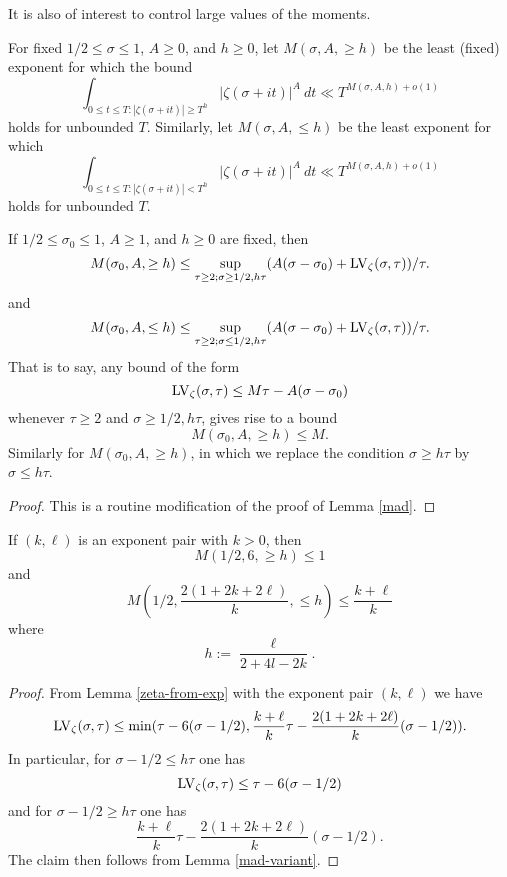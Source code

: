 It is also of interest to control large values of the moments.

\begin{definition}\label{mixed-moment-def}
    For fixed $1/2 \leq \sigma \leq 1$, $A \geq 0$, and $h \geq 0$, let $M(\sigma,A, \geq h)$ be the least (fixed) exponent for which the bound
$$ \int_{0 \leq t \leq T: |\zeta(\sigma+it)| \geq T^h} |\zeta(\sigma+it)|^A\ dt \ll T^{M(\sigma,A,h)+o(1)}$$
holds for unbounded $T$.
Similarly, let $M(\sigma,A,\leq h)$ be the least exponent for which
$$ \int_{0 \leq t \leq T: |\zeta(\sigma+it)| < T^h} |\zeta(\sigma+it)|^A\ dt \ll T^{M(\sigma,A,h)+o(1)}$$
holds for unbounded $T$.
\end{definition}

\begin{lemma}\label{mad-variant}  If $1/2 \leq \sigma_0 \leq 1$, $A \geq 1$, and $h \geq 0$ are fixed, then
    \begin{equation}\label{msah}
        M(\sigma_0,A,\geq h) \leq \sup_{\tau \geq 2; \sigma \geq 1/2, h\tau} (A(\sigma-\sigma_0) + \mathrm{LV}_\zeta(\sigma,\tau))/\tau.
    \end{equation}
and
\begin{equation}\label{msah-2}
    M(\sigma_0,A,\leq h) \leq \sup_{\tau \geq 2; \sigma \leq 1/2, h\tau} (A(\sigma-\sigma_0) + \mathrm{LV}_\zeta(\sigma,\tau))/\tau.
\end{equation}
That is to say, any bound of the form
$$ \mathrm{LV}_\zeta(\sigma,\tau) \leq M \tau - A (\sigma - \sigma_0)$$
whenever $\tau \geq 2$ and $\sigma \geq 1/2, h\tau$, gives rise to a bound
$$ M(\sigma_0,A,\geq h) \leq M.$$
Similarly for $M(\sigma_0,A,\geq h)$, in which we replace the condition $\sigma \geq h\tau$ by $\sigma \leq h\tau$.
\end{lemma}

\begin{proof} This is a routine modification of the proof of Lemma \ref{mad}.
\end{proof}

\begin{corollary}\label{ivic-split}  If $(k,\ell)$ is an exponent pair with $k > 0$, then
    $$ M(1/2,6, \geq h) \leq 1$$
and
$$ M\left(1/2,\frac{2(1+2k+2\ell)}{k}, \leq h\right) \leq \frac{k+\ell}{k}$$
where
$$ h := \frac{\ell}{2+4l-2k}.$$
\end{corollary}

\begin{proof} From Lemma \ref{zeta-from-exp} with the exponent pair $(k,\ell)$ we have
$$ \mathrm{LV}_\zeta(\sigma,\tau) \leq \min( \tau - 6(\sigma-1/2), \frac{k+\ell}{k}\tau - \frac{2(1+2k+2\ell)}{k} (\sigma-1/2) ).$$
In particular, for $\sigma-1/2 \leq h\tau$ one has
$$ \mathrm{LV}_\zeta(\sigma,\tau) \leq \tau - 6(\sigma-1/2)$$
and for $\sigma-1/2 \geq h\tau$ one has
$$ \frac{k+\ell}{k}\tau - \frac{2(1+2k+2\ell)}{k} (\sigma-1/2).$$
The claim then follows from Lemma \ref{mad-variant}.
\end{proof}


